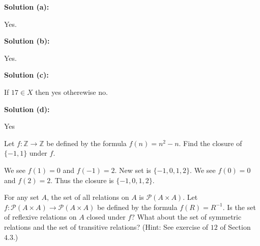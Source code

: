 \textbf{Solution (a):}

Yes.

\textbf{Solution (b):}

Yes.

\textbf{Solution (c):}

If $17 \in X$ then yes otherewise no.

\textbf{Solution (d):}

Yes

\begin{tcolorbox}[title=Problem 3, breakable]
    Let $f : \mathbb{Z} \rightarrow \mathbb{Z}$ be defined by the 
        formula $f(n) = n^2 - n$. Find the closure of
        $\{-1, 1\}$ under $f$.
\end{tcolorbox}

We see $f(1) = 0$ and $f(-1) = 2$. 
New set is $\{-1, 0, 1, 2\}$.
We see $f(0) = 0$ and $f(2) = 2$.
Thus the closure is $\{-1, 0, 1, 2\}$.

\begin{tcolorbox}[title=Problem 4, breakable]
    For any set $A$, the set of all relations on $A$ is 
        $\mathcal{P}(A \times A)$.
    Let $f : \mathcal{P}(A \times A) \rightarrow \mathcal{P}(A \times A)$
    be defined by the formula $f(R) = R^{-1}$.
    Is the set of reflexive relations on $A$ closed under $f$?
    What about the set of symmetric relations
        and the set of transitive relations?
    (Hint: See exercise of $12$ of Section $4.3$.)
\end{tcolorbox}

\begin{tcolorbox}[title=Problem 5, breakable]
\end{tcolorbox}

\begin{tcolorbox}[title=Problem 6, breakable]
\end{tcolorbox}

\begin{tcolorbox}[title=Problem 9, breakable]
\end{tcolorbox}

\begin{tcolorbox}[title=Problem 10, breakable]
\end{tcolorbox}

\begin{tcolorbox}[title=Problem 11, breakable]
\end{tcolorbox}

\begin{tcolorbox}[title=Problem 12, breakable]
\end{tcolorbox}

